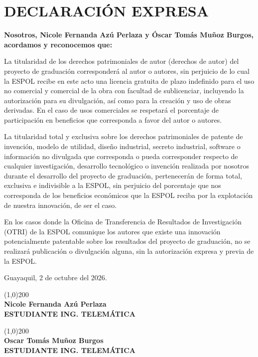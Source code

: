 \chapter*{DECLARACI\'ON EXPRESA}
\thispagestyle{empty}
\textbf{Nosotros, Nicole Fernanda Az\'u Perlaza y \'Oscar Tom\'as Mu\~noz Burgos, acordamos y reconocemos que:}

La titularidad de los derechos patrimoniales de autor (derechos de autor) del proyecto de graduaci\'on corresponder\'a al autor o autores, sin perjuicio de lo cual la ESPOL recibe en este acto una licencia gratuita de plazo indefinido para el uso no comercial y comercial de la obra con facultad de sublicenciar, incluyendo la autorizaci\'on para su divulgaci\'on, as\'i como para la creaci\'on y uso de obras derivadas. En el caso de usos comerciales se respetar\'a el porcentaje de participaci\'on en beneficios que corresponda a favor del autor o autores.

La titularidad total y exclusiva sobre los derechos patrimoniales de patente de invenci\'on, modelo de utilidad, dise\~no industrial, secreto industrial, software o informaci\'on no divulgada que corresponda o pueda corresponder respecto de cualquier investigaci\'on, desarrollo tecnol\'ogico o invenci\'on realizada por nosotros durante el desarrollo del proyecto de graduaci\'on, pertenecer\'an de forma total, exclusiva e indivisible a la ESPOL, sin perjuicio del porcentaje que nos corresponda de los beneficios econ\'omicos que la ESPOL reciba por la explotaci\'on de nuestra innovaci\'on, de ser el caso.

En los casos donde la Oficina de Transferencia de Resultados de Investigaci\'on (OTRI) de la ESPOL comunique los autores que existe una innovaci\'on potencialmente patentable sobre los resultados del proyecto de graduaci\'on, no se realizar\'a publicaci\'on o divulgaci\'on alguna, sin la autorizaci\'on expresa y previa de la ESPOL.

Guayaquil, 2 de octubre del 2026.\par
\vfill
\noindent
\begin{minipage}[b]{.45\linewidth}
    \centering
    \line(1,0){200} \\[0.5em]
    \textbf{Nicole Fernanda Az\'u Perlaza} \\[0.3em]
    \textbf{ESTUDIANTE ING. TELEM\'ATICA}
\end{minipage}
\hfill
\begin{minipage}[b]{.45\linewidth}
    \centering
    \line(1,0){200} \\[0.5em]
    \textbf{Oscar Tom\'as Mu\~noz Burgos} \\[0.3em]
    \textbf{ESTUDIANTE ING. TELEM\'ATICA}
\end{minipage}
\par


